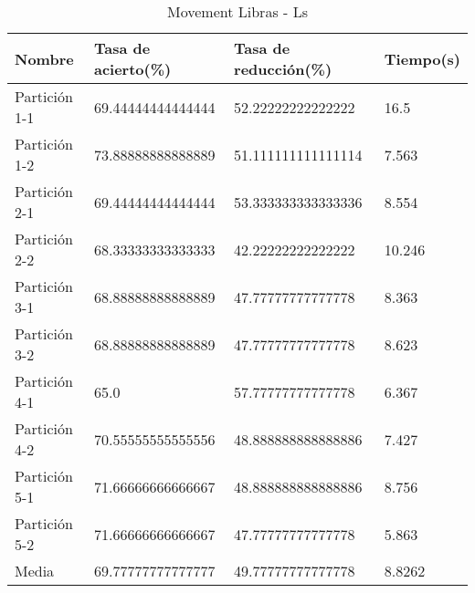 \begin{table}[H]
	\centering
	\caption{Movement Libras - Ls}
	\label{MLIB-LS}
	\begin{tabular}{l|lll}
		Nombre        & Tasa de acierto(\%) & Tasa de reducción(\%) & Tiempo(s) \\ \hline
		Partición 1-1 & 69.44444444444444   & 52.22222222222222     & 16.5      \\
		Partición 1-2 & 73.88888888888889   & 51.111111111111114    & 7.563     \\
		Partición 2-1 & 69.44444444444444   & 53.333333333333336    & 8.554     \\
		Partición 2-2 & 68.33333333333333   & 42.22222222222222     & 10.246    \\
		Partición 3-1 & 68.88888888888889   & 47.77777777777778     & 8.363     \\
		Partición 3-2 & 68.88888888888889   & 47.77777777777778     & 8.623     \\
		Partición 4-1 & 65.0                & 57.77777777777778     & 6.367     \\
		Partición 4-2 & 70.55555555555556   & 48.888888888888886    & 7.427     \\
		Partición 5-1 & 71.66666666666667   & 48.888888888888886    & 8.756     \\
		Partición 5-2 & 71.66666666666667   & 47.77777777777778     & 5.863     \\ \hline
		Media         & 69.77777777777777   & 49.77777777777778     & 8.8262   
	\end{tabular}
\end{table}